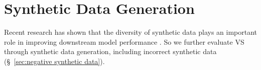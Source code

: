 \section{Synthetic Data Generation}
\label{sec:sythetic data}
\vspace{-0.5em}
Recent research has shown that the diversity of synthetic data plays an important role in improving downstream model performance \citep{chen_diversity_2024,zhu2025bareleveragingbaselanguage}. So we further evaluate VS through synthetic data generation, including incorrect synthetic data (\S~\ref{sec:negative synthetic data}).





